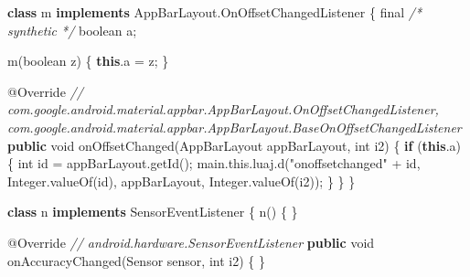 \documentclass[
]{article}
\newenvironment{Shaded}{}{}
\newcommand{\AttributeTok}[1]{\textcolor[rgb]{0.49,0.56,0.16}{#1}}
\newcommand{\BuiltInTok}[1]{\textcolor[rgb]{0.00,0.50,0.00}{#1}}
\newcommand{\CommentTok}[1]{\textcolor[rgb]{0.38,0.63,0.69}{\textit{#1}}}
\newcommand{\ControlFlowTok}[1]{\textcolor[rgb]{0.00,0.44,0.13}{\textbf{#1}}}
\newcommand{\DataTypeTok}[1]{\textcolor[rgb]{0.56,0.13,0.00}{#1}}
\newcommand{\FunctionTok}[1]{\textcolor[rgb]{0.02,0.16,0.49}{#1}}
\newcommand{\KeywordTok}[1]{\textcolor[rgb]{0.00,0.44,0.13}{\textbf{#1}}}
\newcommand{\NormalTok}[1]{#1}
\newcommand{\OperatorTok}[1]{\textcolor[rgb]{0.40,0.40,0.40}{#1}}
\newcommand{\StringTok}[1]{\textcolor[rgb]{0.25,0.44,0.63}{#1}}
\begin{document}
\begin{Shaded}
\begin{Highlighting}[]
    \KeywordTok{class}\NormalTok{ m }\KeywordTok{implements}\NormalTok{ AppBarLayout}\OperatorTok{.}\FunctionTok{OnOffsetChangedListener} \OperatorTok{\{}
        \DataTypeTok{final} \CommentTok{/* synthetic */} \DataTypeTok{boolean}\NormalTok{ a}\OperatorTok{;}

        \FunctionTok{m}\OperatorTok{(}\DataTypeTok{boolean}\NormalTok{ z}\OperatorTok{)} \OperatorTok{\{}
            \KeywordTok{this}\OperatorTok{.}\FunctionTok{a} \OperatorTok{=}\NormalTok{ z}\OperatorTok{;}
        \OperatorTok{\}}

        \AttributeTok{@Override} \CommentTok{// com.google.android.material.appbar.AppBarLayout.OnOffsetChangedListener, com.google.android.material.appbar.AppBarLayout.BaseOnOffsetChangedListener}
        \KeywordTok{public} \DataTypeTok{void} \FunctionTok{onOffsetChanged}\OperatorTok{(}\NormalTok{AppBarLayout appBarLayout}\OperatorTok{,} \DataTypeTok{int}\NormalTok{ i2}\OperatorTok{)} \OperatorTok{\{}
            \ControlFlowTok{if} \OperatorTok{(}\KeywordTok{this}\OperatorTok{.}\FunctionTok{a}\OperatorTok{)} \OperatorTok{\{}
                \DataTypeTok{int}\NormalTok{ id }\OperatorTok{=}\NormalTok{ appBarLayout}\OperatorTok{.}\FunctionTok{getId}\OperatorTok{();}
\NormalTok{                main}\OperatorTok{.}\FunctionTok{this}\OperatorTok{.}\FunctionTok{luaj}\OperatorTok{.}\FunctionTok{d}\OperatorTok{(}\StringTok{"onoffsetchanged"} \OperatorTok{+}\NormalTok{ id}\OperatorTok{,} \BuiltInTok{Integer}\OperatorTok{.}\FunctionTok{valueOf}\OperatorTok{(}\NormalTok{id}\OperatorTok{),}\NormalTok{ appBarLayout}\OperatorTok{,} \BuiltInTok{Integer}\OperatorTok{.}\FunctionTok{valueOf}\OperatorTok{(}\NormalTok{i2}\OperatorTok{));}
            \OperatorTok{\}}
        \OperatorTok{\}}
    \OperatorTok{\}}

    \KeywordTok{class}\NormalTok{ n }\KeywordTok{implements}\NormalTok{ SensorEventListener }\OperatorTok{\{}
        \FunctionTok{n}\OperatorTok{()} \OperatorTok{\{}
        \OperatorTok{\}}

        \AttributeTok{@Override} \CommentTok{// android.hardware.SensorEventListener}
        \KeywordTok{public} \DataTypeTok{void} \FunctionTok{onAccuracyChanged}\OperatorTok{(}\NormalTok{Sensor sensor}\OperatorTok{,} \DataTypeTok{int}\NormalTok{ i2}\OperatorTok{)} \OperatorTok{\{}
        \OperatorTok{\}}


\end{Highlighting}
\end{Shaded}
\end{document}
